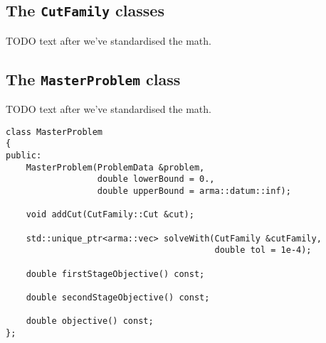 \documentclass[12pt, english]{article}
\begin{document}
\subsection{The \texttt{CutFamily} classes}
\label{subsec:cut_families}

TODO text after we've standardised the math.

\subsection{The \texttt{MasterProblem} class}
\label{subsec:master_problem_class}

TODO text after we've standardised the math.

\begin{lstlisting}[caption={Public interface of the \texttt{MasterProblem} class.}, 
                   label={listing:master_problem}]
class MasterProblem
{
public:
	MasterProblem(ProblemData &problem,
				  double lowerBound = 0.,
				  double upperBound = arma::datum::inf);
	
	void addCut(CutFamily::Cut &cut);
	
	std::unique_ptr<arma::vec> solveWith(CutFamily &cutFamily,
	                                     double tol = 1e-4);
	
	double firstStageObjective() const;
	
	double secondStageObjective() const;
	
	double objective() const;
};
\end{lstlisting}



	
\end{document}
